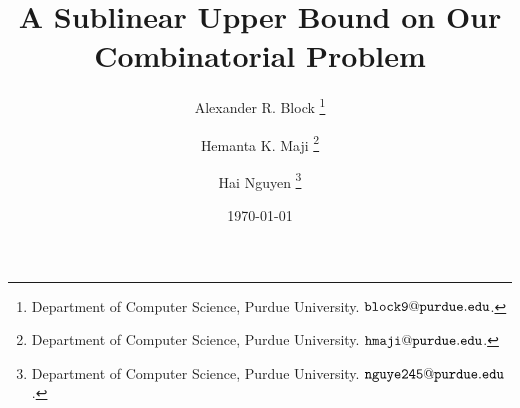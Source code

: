 \documentclass[
xcolor={svgnames},
hyperref={colorlinks,citecolor=DeepPink4,linkcolor=DarkRed,urlcolor=DarkBlue},
handout
]{beamer}
\author{
  Alexander R. Block%
\ifcomment
  \thanks{
	Department of Computer Science,
	Purdue University.
	\href{mailto:\alexemail}{$\mathtt{block9@purdue.edu}$}.
  }\and 
  Hemanta K. Maji%
  \thanks{
    Department of Computer Science,
    Purdue University.
    \href{mailto:\majiemail}{$\mathtt{hmaji@purdue.edu}$}.
  }\and
  Hai Nguyen%
  \thanks{
	Department of Computer Science,
	Purdue University.
	\href{mailto:\haiemail}{$\mathtt{nguye245@purdue.edu}$}.
  } \fi
}
\title{A Sublinear Upper Bound on Our Combinatorial Problem}
\date{\today}
\begin{document}
\frame{\maketitle}

\frame{\tableofcontents}













\end{document}
